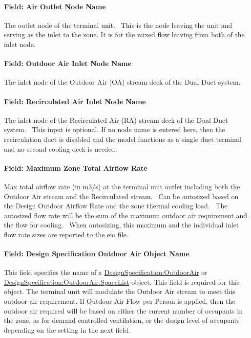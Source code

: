 \paragraph{Field: Air Outlet Node Name}\label{field-air-outlet-node-name-9}

The outlet node of the terminal unit.~ This is the node leaving the unit and serving as the inlet to the zone. It is for the mixed flow leaving from both of the inlet node.

\paragraph{Field: Outdoor Air Inlet Node Name}\label{field-outdoor-air-inlet-node-name}

The inlet node of the Outdoor Air (OA) stream deck of the Dual Duct system.

\paragraph{Field: Recirculated Air Inlet Node Name}\label{field-recirculated-air-inlet-node-name}

The inlet node of the Recirculated Air (RA) stream deck of the Dual Duct system. ~This input is optional. If no node name is entered here, then the recirculation duct is disabled and the model functions as a single duct terminal and no second cooling deck is needed.

\paragraph{Field: Maximum Zone Total Airflow Rate}\label{field-maximum-zone-total-airflow-rate}

Max total airflow rate (in m3/s) at the terminal unit outlet including both the Outdoor Air stream and the Recirculated stream.~ Can be autosized based on the Design Outdoor Airflow Rate and the zone thermal cooling load.~ The autosized flow rate will be the sum of the maximum outdoor air requirement and the flow for cooling. ~When autosizing, this maximum and the individual inlet flow rate sizes are reported to the eio file.

\paragraph{Field: Design Specification Outdoor Air Object Name}\label{field-design-specification-outdoor-air-object-name-3}

This field specifies the name of a \hyperref[designspecificationoutdoorair]{DesignSpecification:OutdoorAir} or \hyperref[designspecificationoutdoorairspacelist]{DesignSpecification:OutdoorAir:SpaceList} object. This field is required for this object. The terminal unit will modulate the Outdoor Air stream to meet this outdoor air requirement. If Outdoor Air Flow per Person is applied, then the outdoor air required will be based on either the current number of occupants in the zone, as for demand controlled ventilation, or the design level of occupants depending on the setting in the next field.

